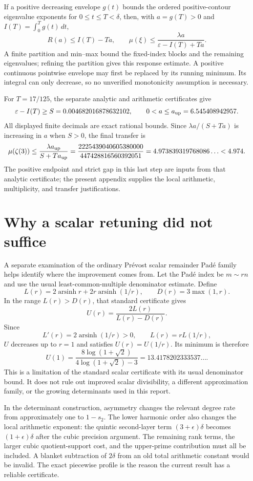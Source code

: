\documentclass[11pt]{article}
\theoremstyle{definition}\newtheorem{definition}[theorem]{Definition}
\theoremstyle{remark}\newtheorem{remark}[theorem]{Remark}
\DeclareMathOperator{\arsinh}{arsinh}
\begin{document}
If a positive decreasing envelope $g(t)$ bounds the ordered
positive-contour eigenvalue exponents for $0\le t\le T<\delta$,
then, with $a=g(T)>0$ and $I(T)=\int_0^Tg(t)\,dt$,
\[
 R(a)\le I(T)-Ta,\qquad
 \mu(\xi)\le\frac{\lambda a}{\varepsilon-I(T)+Ta}.
\]
A finite partition and min--max bound the fixed-index blocks and
the remaining eigenvalues; refining the partition gives this
response estimate. A positive continuous pointwise envelope may
first be replaced by its running minimum. Its integral can only
decrease, so no unverified monotonicity assumption is necessary.

For $T=17/125$, the separate analytic and arithmetic certificates
give
\[
 \varepsilon-I(T)\ge S=0.004682016878632102,
 \qquad 0<a\le a_{\rm up}=6.545408942957.
\]
All displayed finite decimals are exact rational bounds. Since
$\lambda a/(S+Ta)$ is increasing in $a$ when $S>0$, the final
transfer is
\begin{equation}\label{zthree:finaltransfer}
 \mu(\zeta(3))\le
 \frac{\lambda a_{\rm up}}{S+Ta_{\rm up}}
 =\frac{2225439040605380000}{447428816560392051}
 =4.973839319768086\ldots<4.974.
\end{equation}
The positive endpoint and strict gap in this last step are inputs
from that analytic certificate; the present appendix supplies the
local arithmetic, multiplicity, and transfer justifications.

\section{Why a scalar retuning did not suffice}\label{sec:scalar}
A separate examination of the ordinary Pr\'evost scalar remainder Pad\'e family helps identify where the improvement comes from. Let the Pad\'e index be $m\sim rn$ and use the usual least-common-multiple denominator estimate. Define
\[
 L(r)=2\arsinh r+2r\arsinh(1/r),\qquad D(r)=3\max(1,r).
\]
In the range $L(r)>D(r)$, that standard certificate gives
\[
 U(r)=\frac{2L(r)}{L(r)-D(r)}.
\]
Since
\[
 L'(r)=2\arsinh(1/r)>0,\qquad L(r)=rL(1/r),
\]
$U$ decreases up to $r=1$ and satisfies $U(r)=U(1/r)$. Its minimum is therefore
\[
 U(1)=\frac{8\log(1+\sqrt2)}{4\log(1+\sqrt2)-3}
 =13.4178202333537\ldots.
\]
This is a limitation of the standard scalar certificate with its usual denominator bound. It does not rule out improved scalar divisibility, a different approximation family, or the growing determinants used in this report.

In the determinant construction, asymmetry changes the relevant degree rate from approximately one to $1-s_2$. The lower harmonic order also changes the local arithmetic exponent: the quintic second-layer term $(3+\epsilon)\delta$ becomes $(1+\epsilon)\delta$ after the cubic precision argument. The remaining rank terms, the larger cubic quotient-support cost, and the upper-prime contribution must all be included. A blanket subtraction of $2\delta$ from an old total arithmetic constant would be invalid. The exact piecewise profile is the reason the current result has a reliable certificate.
\end{document}
